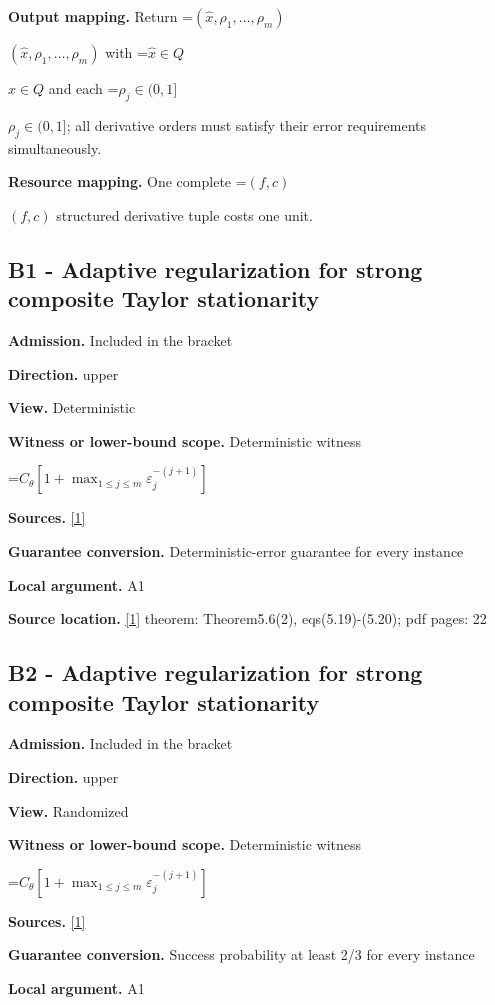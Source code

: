 \documentclass[10pt,a4paper]{article}
\newcommand{\AtlasMath}[1]{\par\begingroup\centering\setbox0=\hbox{$\displaystyle #1$}\ifdim\wd0>1.4\linewidth\typeout{ATLAS WIDE FORMULA: \the\wd0}\fi\ifdim\wd0>\linewidth\resizebox{\linewidth}{!}{\box0}\else\box0\fi\par\endgroup}
\newcommand{\AtlasInlineMath}[1]{\begingroup\setbox0=\hbox{$#1$}\ifdim\wd0>.4\linewidth\endgroup\AtlasMath{#1}\else\endgroup$#1$\fi}
\begin{document}
\textbf{Output mapping.} Return \AtlasInlineMath{(\widehat{x},\rho_1,\ldots,\rho_m)} with \AtlasInlineMath{\widehat{x}\in Q} and each \AtlasInlineMath{\rho_j\in(0,1]}; all derivative orders must satisfy their error requirements simultaneously.

\textbf{Resource mapping.} One complete \AtlasInlineMath{(f,c)} structured derivative tuple costs one unit.

\subsection{B1 - Adaptive regularization for strong composite Taylor stationarity}
\textbf{Admission.} Included in the bracket

\textbf{Direction.} upper

\textbf{View.} Deterministic

\textbf{Witness or lower-bound scope.} Deterministic witness

\AtlasMath{C_\theta[1+\max_{1\le j\le m}\varepsilon_j^{-(j+1)}]}
\textbf{Sources.} \href{https://optimization-online.org/wp-content/uploads/2020/01/7590.pdf}{[1]}

\textbf{Guarantee conversion.} Deterministic-error guarantee for every instance

\textbf{Local argument.} A1

\textbf{Source location.} \href{https://optimization-online.org/wp-content/uploads/2020/01/7590.pdf}{[1]} theorem: Theorem5.6(2), eqs(5.19)-(5.20); pdf pages: 22

\subsection{B2 - Adaptive regularization for strong composite Taylor stationarity}
\textbf{Admission.} Included in the bracket

\textbf{Direction.} upper

\textbf{View.} Randomized

\textbf{Witness or lower-bound scope.} Deterministic witness

\AtlasMath{C_\theta[1+\max_{1\le j\le m}\varepsilon_j^{-(j+1)}]}
\textbf{Sources.} \href{https://optimization-online.org/wp-content/uploads/2020/01/7590.pdf}{[1]}

\textbf{Guarantee conversion.} Success probability at least 2/3 for every instance

\textbf{Local argument.} A1
\end{document}
